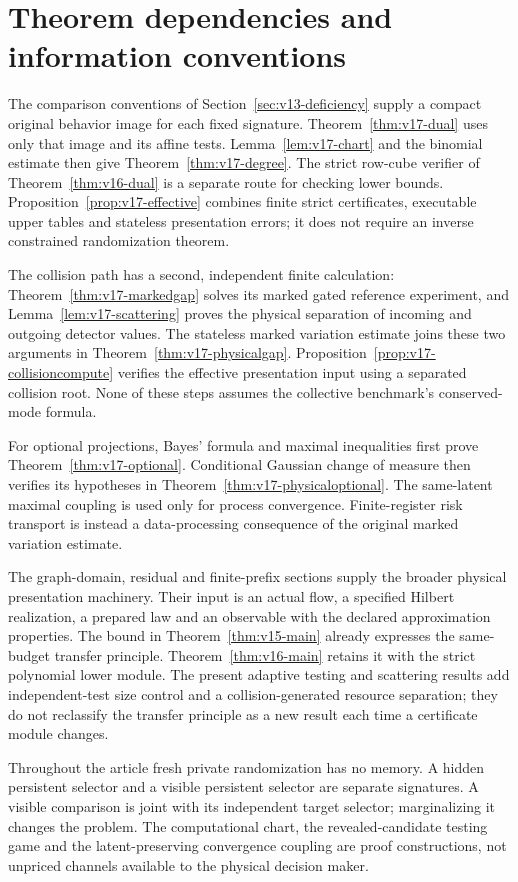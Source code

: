 \appendix
\section{Theorem dependencies and information conventions}
\label{sec:v17-dependencies}

The comparison conventions of Section~\ref{sec:v13-deficiency} supply
a compact original behavior image for each fixed signature.
Theorem~\ref{thm:v17-dual} uses only that image and its affine tests.
Lemma~\ref{lem:v17-chart} and the binomial estimate then give
Theorem~\ref{thm:v17-degree}. The strict row-cube verifier of
Theorem~\ref{thm:v16-dual} is a separate route for checking lower
bounds. Proposition~\ref{prop:v17-effective} combines finite strict
certificates, executable upper tables and stateless presentation
errors; it does not require an inverse constrained randomization
theorem.

The collision path has a second, independent finite calculation:
Theorem~\ref{thm:v17-markedgap} solves its marked gated reference
experiment, and Lemma~\ref{lem:v17-scattering} proves the physical
separation of incoming and outgoing detector values. The stateless
marked variation estimate joins these two arguments in
Theorem~\ref{thm:v17-physicalgap}.
Proposition~\ref{prop:v17-collisioncompute} verifies the effective
presentation input using a separated collision root. None of these
steps assumes the collective benchmark's conserved-mode formula.

For optional projections, Bayes' formula and maximal inequalities
first prove Theorem~\ref{thm:v17-optional}. Conditional Gaussian
change of measure then verifies its hypotheses in
Theorem~\ref{thm:v17-physicaloptional}. The same-latent maximal
coupling is used only for process convergence. Finite-register risk
transport is instead a data-processing consequence of the original
marked variation estimate.

The graph-domain, residual and finite-prefix sections supply the
broader physical presentation machinery. Their input is an actual
flow, a specified Hilbert realization, a prepared law and an observable
with the declared approximation properties. The bound in
Theorem~\ref{thm:v15-main} already expresses the same-budget transfer
principle. Theorem~\ref{thm:v16-main} retains it with the strict
polynomial lower module. The present adaptive testing and scattering
results add independent-test size control and a collision-generated
resource separation; they do not reclassify the transfer principle as
a new result each time a certificate module changes.

Throughout the article fresh private randomization has no memory.
A hidden persistent selector and a visible persistent selector are
separate signatures. A visible comparison is joint with its
independent target selector; marginalizing it changes the problem.
The computational chart, the revealed-candidate testing game and the
latent-preserving convergence coupling are proof constructions, not
unpriced channels available to the physical decision maker.
